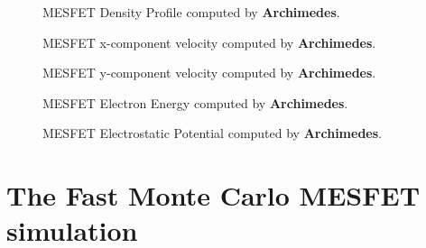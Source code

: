 \documentclass[12pt]{book}
\begin{document}
\begin{figure}[htb!]
\centerline{} 
\caption{\small MESFET Density Profile computed by \textbf{Archimedes}.}
\label{MESFET1}
\end{figure}

\begin{figure}[htb!]
\centerline{} 
\caption{\small MESFET x-component velocity computed by \textbf{Archimedes}.}
\label{MESFET2}
\centerline{} 
\caption{\small MESFET y-component velocity computed by \textbf{Archimedes}.}
\label{MESFET3}
\end{figure}

\begin{figure}[htb!]
\centerline{} 
\caption{\small MESFET Electron Energy computed by \textbf{Archimedes}.}
\label{MESFET4}
\centerline{} 
\caption{\small MESFET Electrostatic Potential computed by \textbf{Archimedes}.}
\label{MESFET5}
\end{figure}

\section{The Fast Monte Carlo MESFET simulation}
\end{document}
